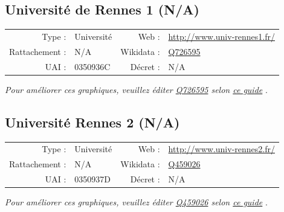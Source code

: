\documentclass[12pt,french,landscape]{article}
\begin{document}
\newpage

\hypertarget{universituxe9-de-rennes-1-na}{%
\subsection{Université de Rennes 1
(N/A)}\label{universituxe9-de-rennes-1-na}}

\begin{tabular*}{0.45\textwidth}{rp{2cm}rl}  
\hline  
Type : & Université & Web : &\href{http://www.univ-rennes1.fr/}{http://www.univ-rennes1.fr/} \\  
Rattachement : & N/A & Wikidata : & \href{https://www.wikidata.org/entity/Q726595}{Q726595} \\  
UAI : & 0350936C & Décret : & N/A \\  
\hline  
\end{tabular*}

\textit{\scriptsize Pour améliorer ces graphiques, veuillez éditer \href{https://www.wikidata.org/entity/Q726595}{Q726595}  selon \href{https://github.com/cpesr/wikidataESR/blob/master/Rmd/wikidataESR.md}{ce guide}}
.


\newpage

\hypertarget{universituxe9-rennes-2-na}{%
\subsection{Université Rennes 2 (N/A)}\label{universituxe9-rennes-2-na}}

\begin{tabular*}{0.45\textwidth}{rp{2cm}rl}  
\hline  
Type : & Université & Web : &\href{http://www.univ-rennes2.fr/}{http://www.univ-rennes2.fr/} \\  
Rattachement : & N/A & Wikidata : & \href{https://www.wikidata.org/entity/Q459026}{Q459026} \\  
UAI : & 0350937D & Décret : & N/A \\  
\hline  
\end{tabular*}

\textit{\scriptsize Pour améliorer ces graphiques, veuillez éditer \href{https://www.wikidata.org/entity/Q459026}{Q459026}  selon \href{https://github.com/cpesr/wikidataESR/blob/master/Rmd/wikidataESR.md}{ce guide}}
.

\end{document}
